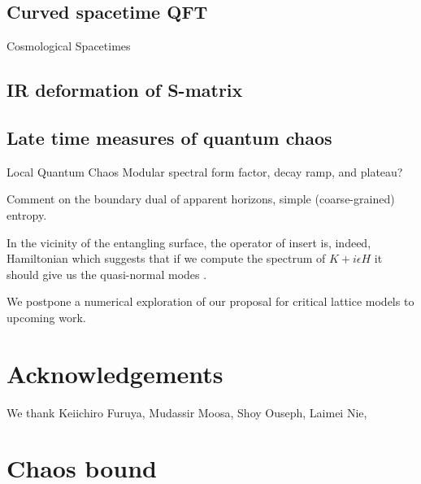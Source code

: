 \documentclass[a4paper,11pt]{article}
\theoremstyle{definition}
\begin{document}
\subsection{Curved spacetime QFT}
Cosmological Spacetimes

\subsection{IR deformation of S-matrix}

\subsection{Late time measures of quantum chaos}
Local Quantum Chaos
Modular spectral form factor, decay ramp, and plateau?

Comment on the boundary dual of apparent horizons, simple (coarse-grained) entropy.

In the vicinity of the entangling surface, the operator of insert is, indeed, Hamiltonian which suggests that if we compute the spectrum of $K+i\epsilon H$ it should give us the quasi-normal modes \cite{maldacenapaper}.


We postpone a numerical exploration of our proposal for critical lattice models to upcoming work.

\section*{Acknowledgements}
We thank Keiichiro Furuya, Mudassir Moosa, Shoy Ouseph, Laimei Nie, 


\appendix



\section{Chaos bound}
\end{document}
